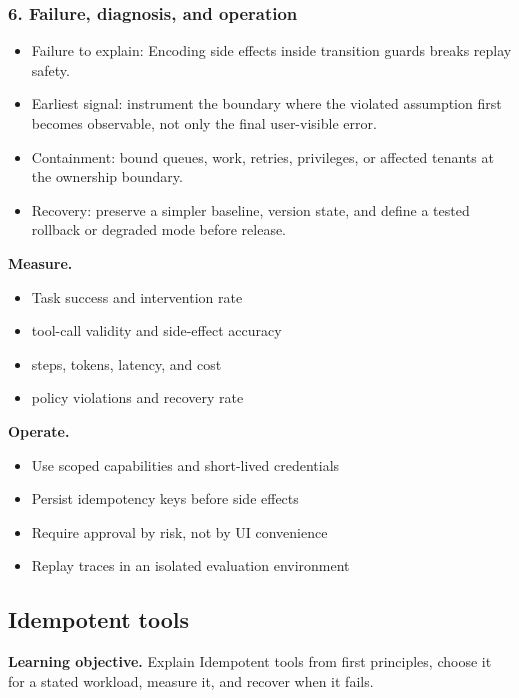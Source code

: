 \subsubsection*{6. Failure, diagnosis, and operation}
\begin{itemize}
\item Failure to explain: Encoding side effects inside transition guards breaks replay safety.
\item Earliest signal: instrument the boundary where the violated assumption first becomes observable, not only the final user-visible error.
\item Containment: bound queues, work, retries, privileges, or affected tenants at the ownership boundary.
\item Recovery: preserve a simpler baseline, version state, and define a tested rollback or degraded mode before release.
\end{itemize}
\textbf{Measure.}\begin{itemize}
\item Task success and intervention rate
\item tool-call validity and side-effect accuracy
\item steps, tokens, latency, and cost
\item policy violations and recovery rate
\end{itemize}
\textbf{Operate.}\begin{itemize}
\item Use scoped capabilities and short-lived credentials
\item Persist idempotency keys before side effects
\item Require approval by risk, not by UI convenience
\item Replay traces in an isolated evaluation environment
\end{itemize}
\subsection{Idempotent tools}
\textbf{Learning objective.} Explain Idempotent tools from first principles, choose it for a stated workload, measure it, and recover when it fails.
